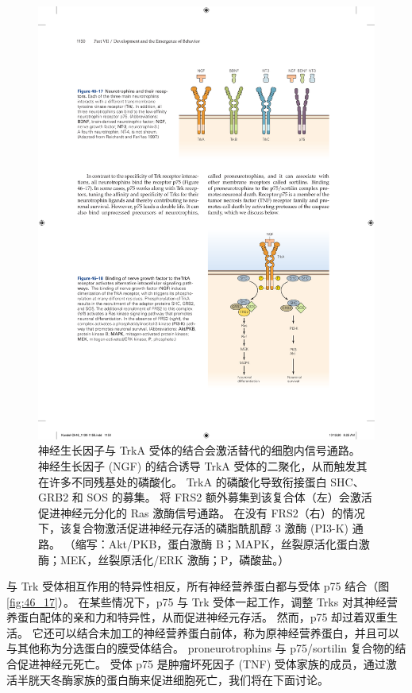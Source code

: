 \begin{figure}[htbp]
	\centering
	\includegraphics[width=0.5\linewidth]{chap46/fig_46_18}
	\caption{神经生长因子与 TrkA 受体的结合会激活替代的细胞内信号通路。 神经生长因子 (NGF) 的结合诱导 TrkA 受体的二聚化，从而触发其在许多不同残基处的磷酸化。 TrkA 的磷酸化导致衔接蛋白 SHC、GRB2 和 SOS 的募集。 将 FRS2 额外募集到该复合体（左）会激活促进神经元分化的 Ras 激酶信号通路。 在没有 FRS2（右）的情况下，该复合物激活促进神经元存活的磷脂酰肌醇 3 激酶 (PI3-K) 通路。 （缩写：Akt/PKB，蛋白激酶 B；MAPK，丝裂原活化蛋白激酶；MEK，丝裂原活化/ERK 激酶；P，磷酸盐。）}
	\label{fig:46_18}
\end{figure}

与 Trk 受体相互作用的特异性相反，所有神经营养蛋白都与受体 p75 结合（图 \ref{fig:46_17}）。 
在某些情况下，p75 与 Trk 受体一起工作，调整 Trks 对其神经营养蛋白配体的亲和力和特异性，从而促进神经元存活。 然而，p75 却过着双重生活。 它还可以结合未加工的神经营养蛋白前体，称为原神经营养蛋白，并且可以与其他称为分选蛋白的膜受体结合。 proneurotrophins 与 p75/sortilin 复合物的结合促进神经元死亡。 受体 p75 是肿瘤坏死因子 (TNF) 受体家族的成员，通过激活半胱天冬酶家族的蛋白酶来促进细胞死亡，我们将在下面讨论。

